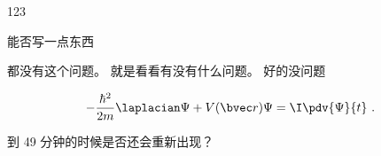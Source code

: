 
123

能否写一点东西

都没有这个问题。 就是看看有没有什么问题。 好的没问题

\begin{equation}
-\frac{\hbar^2}{2m}\laplacian\Psi + V(\bvec r)\Psi = \I\pdv{\Psi}{t}~.
\end{equation}

到 49 分钟的时候是否还会重新出现？
